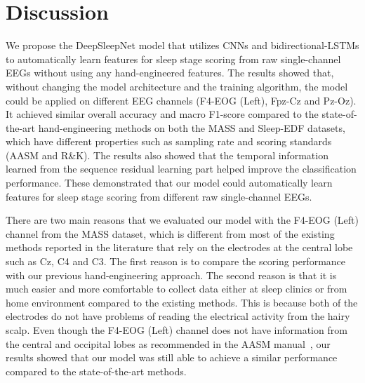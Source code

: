 \documentclass[journal,twoside]{IEEEtran}
\begin{document}
\section{Discussion}
We propose the DeepSleepNet model that utilizes CNNs and bidirectional-LSTMs to automatically learn features for sleep stage scoring from raw single-channel EEGs without using any hand-engineered features. The results showed that, without changing the model architecture and the training algorithm, the model could be applied on different EEG channels (F4-EOG (Left), Fpz-Cz and Pz-Oz). It achieved similar overall accuracy and macro F1-score compared to the state-of-the-art hand-engineering methods on both the MASS and Sleep-EDF datasets, which have different properties such as sampling rate and scoring standards (AASM and R\&K). The results also showed that the temporal information learned from the sequence residual learning part helped improve the classification performance. These demonstrated that our model could automatically learn features for sleep stage scoring from different raw single-channel EEGs.


There are two main reasons that we evaluated our model with the F4-EOG (Left) channel from the MASS dataset, which is different from most of the existing methods reported in the literature that rely on the electrodes at the central lobe such as Cz, C4 and C3. The first reason is to compare the scoring performance with our previous hand-engineering approach. The second reason is that it is much easier and more comfortable to collect data either at sleep clinics or from home environment compared to the existing methods.
This is because both of the electrodes do not have problems of reading the electrical activity from the hairy scalp. Even though the F4-EOG (Left) channel does not have information from the central and occipital lobes as recommended in the AASM manual~\cite{iber2007}, our results showed that our model was still able to achieve a similar performance compared to the state-of-the-art methods.
\end{document}
